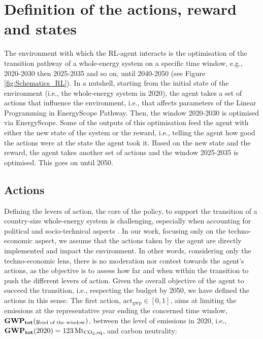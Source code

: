 \documentclass[11pt,twoside,a4paper,english]{article}
\def\eg{e.g., }
\def\ie{i.e., }
\begin{document}
\section{Definition of the actions, reward and states}
\label{sec:RL:act_states_rew}
The environment with which the \gls{RL}-agent interacts is the optimisation of the transition pathway of a whole-energy system on a specific time window, \eg 2020-2030 then 2025-2035 and so on, until 2040-2050 (see Figure \ref{fig:Schematics_RL}). In a nutshell, starting from the initial state of the environment (\ie the whole-energy system in 2020), the agent takes a set of actions that influence the environment, \ie that affects parameters of the Linear Programming in EnergyScope Pathway. Then, the window 2020-2030 is optimised via EnergyScope. Some of the outputs of this optimisation feed the agent with either the new state of the system or the reward, \ie telling the agent how good the actions were at the state the agent took it. Based on the new state and the reward, the agent takes another set of actions and the window 2025-2035 is optimised. This goes on until 2050.



\subsection{Actions}
\label{subsec:RL:act_states_rew:act}

Defining the levers of action, the core of the policy, to support the transition of a country-size whole-energy system is challenging, especially when accounting for political and socio-technical aspects \cite{castrejon2020making}. In our work, focusing only on the techno-economic aspect, we assume that the actions taken by the agent are directly implemented and impact the environment. In other words, considering only the techno-economic lens, there is no moderation nor contest towards the agent's actions, as the objective is to assess how far and when within the transition to push the different levers of action. Given the overall objective of the agent to succeed the transition, \ie respecting the  budget by 2050, we have defined the actions in this sense. The first action, $\mathrm{act}_{\mathrm{gwp}} \in [0,1]$, aims at limiting the emissions at the representative year ending the concerned time window, $\textbf{GWP\textsubscript{tot}}(y_{\text{end of the window}})$, between the level of emissions in 2020, \ie $\textbf{GWP\textsubscript{tot}}(2020)=123\,\text{Mt}_{\ce{CO2},\text{eq}}$, and carbon neutrality:
\end{document}
